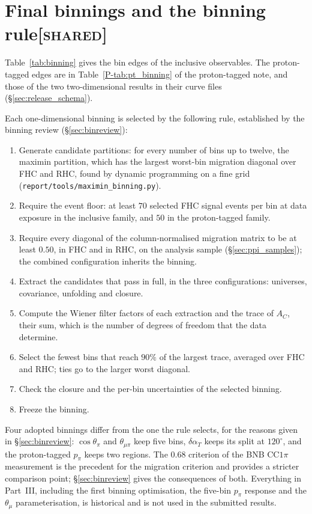 \documentclass[11pt,a4paper]{article}
\newcommand{\ptref}[2]{#1~\ref{P-#2} of the proton-tagged note}
\newcommand{\scopetag}[1]{\hfill{\normalfont\small\textsc{[#1]}}}
\begin{document}
%

%

\section[Final binnings and the binning rule]{Final binnings and the binning rule\scopetag{shared}}
\label{sec:final_binning}

Table~\ref{tab:binning} gives the bin edges of the inclusive observables. The proton-tagged edges are
in \ptref{Table}{tab:pt_binning}, and those of the two two-dimensional results in their curve files
(\S\ref{sec:release_schema}).



Each one-dimensional binning is selected by the following rule, established by the binning review
(\S\ref{sec:binreview}):
\begin{enumerate}\itemsep1pt
  \item Generate candidate partitions: for every number of bins up to twelve, the maximin partition,
    which has the largest worst-bin migration diagonal over FHC and RHC, found by dynamic programming
    on a fine grid (\texttt{report/tools/maximin\_binning.py}).
  \item Require the event floor: at least $70$ selected FHC signal events per bin at data exposure in
    the inclusive family, and $50$ in the proton-tagged family.
  \item Require every diagonal of the column-normalised migration matrix to be at least $0.50$, in FHC
    and in RHC, on the analysis sample (\S\ref{sec:ppi_samples}); the combined configuration inherits
    the binning.
  \item Extract the candidates that pass in full, in the three configurations: universes, covariance,
    unfolding and closure.
  \item Compute the Wiener filter factors of each extraction and the trace of $A_C$, their sum, which
    is the number of degrees of freedom that the data determine.
  \item Select the fewest bins that reach $90\%$ of the largest trace, averaged over FHC and RHC; ties
    go to the larger worst diagonal.
  \item Check the closure and the per-bin uncertainties of the selected binning.
  \item Freeze the binning.
\end{enumerate}
Four adopted binnings differ from the one the rule selects, for the reasons given in
\S\ref{sec:binreview}: $\cos\theta_\pi$ and $\theta_{\mu\pi}$ keep five bins, $\delta\alpha_T$ keeps its
split at $120^\circ$, and the proton-tagged $p_\pi$ keeps two regions. The $0.68$ criterion of the BNB
CC$1\pi$ measurement is the precedent for the migration criterion and provides a stricter comparison
point; \S\ref{sec:binreview} gives the consequences of both. Everything in Part~III, including the
first binning optimisation, the five-bin $p_\pi$ response and the $\theta_\mu$ parameterisation, is
historical and is not used in the submitted results.
\end{document}
